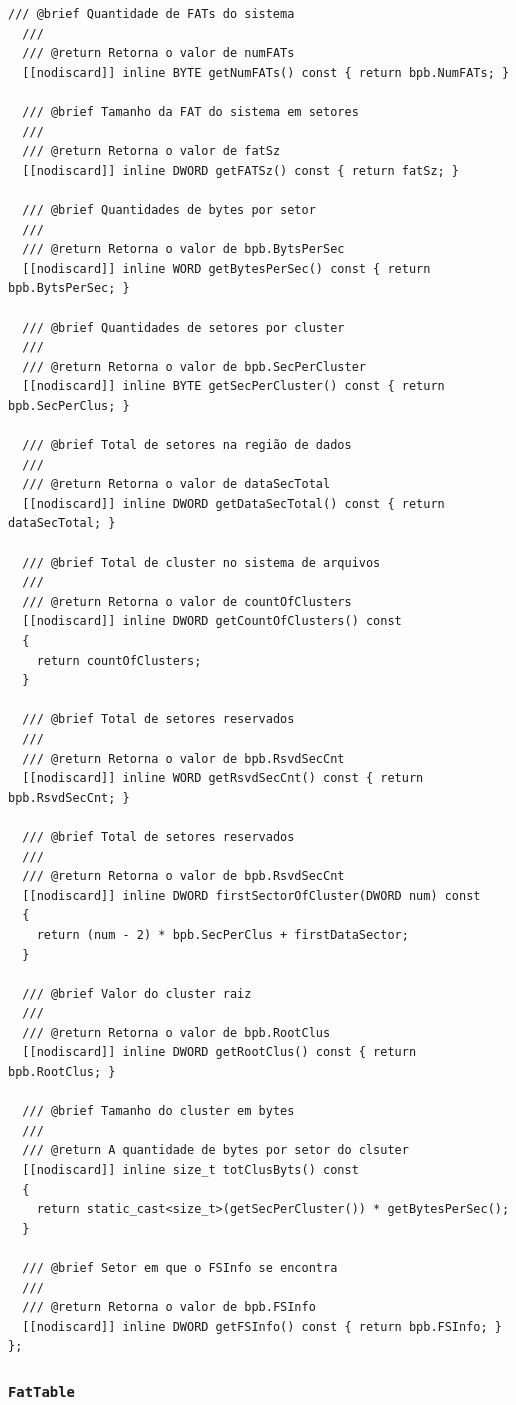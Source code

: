 \documentclass[
    12pt,				%
    oneside,   	        %
    a4paper,			%
    english,			%
    french,				%
    spanish,			%
    brazil,				%
    ]{pacotes/abntex2}
\begin{document}
\begin{lstlisting}[caption={Classe que abstrai a extração de informações da estrutura BPB}, label={lst:biosblock}]
  /// @brief Quantidade de FATs do sistema
  ///
  /// @return Retorna o valor de numFATs
  [[nodiscard]] inline BYTE getNumFATs() const { return bpb.NumFATs; }

  /// @brief Tamanho da FAT do sistema em setores
  ///
  /// @return Retorna o valor de fatSz
  [[nodiscard]] inline DWORD getFATSz() const { return fatSz; }

  /// @brief Quantidades de bytes por setor
  ///
  /// @return Retorna o valor de bpb.BytsPerSec
  [[nodiscard]] inline WORD getBytesPerSec() const { return bpb.BytsPerSec; }

  /// @brief Quantidades de setores por cluster
  ///
  /// @return Retorna o valor de bpb.SecPerCluster
  [[nodiscard]] inline BYTE getSecPerCluster() const { return bpb.SecPerClus; }

  /// @brief Total de setores na região de dados
  ///
  /// @return Retorna o valor de dataSecTotal
  [[nodiscard]] inline DWORD getDataSecTotal() const { return dataSecTotal; }

  /// @brief Total de cluster no sistema de arquivos
  ///
  /// @return Retorna o valor de countOfClusters
  [[nodiscard]] inline DWORD getCountOfClusters() const
  {
    return countOfClusters;
  }

  /// @brief Total de setores reservados
  ///
  /// @return Retorna o valor de bpb.RsvdSecCnt
  [[nodiscard]] inline WORD getRsvdSecCnt() const { return bpb.RsvdSecCnt; }

  /// @brief Total de setores reservados
  ///
  /// @return Retorna o valor de bpb.RsvdSecCnt
  [[nodiscard]] inline DWORD firstSectorOfCluster(DWORD num) const
  {
    return (num - 2) * bpb.SecPerClus + firstDataSector;
  }

  /// @brief Valor do cluster raiz
  ///
  /// @return Retorna o valor de bpb.RootClus
  [[nodiscard]] inline DWORD getRootClus() const { return bpb.RootClus; }

  /// @brief Tamanho do cluster em bytes
  ///
  /// @return A quantidade de bytes por setor do clsuter
  [[nodiscard]] inline size_t totClusByts() const
  {
    return static_cast<size_t>(getSecPerCluster()) * getBytesPerSec();
  }

  /// @brief Setor em que o FSInfo se encontra
  ///
  /// @return Retorna o valor de bpb.FSInfo
  [[nodiscard]] inline DWORD getFSInfo() const { return bpb.FSInfo; }
};
\end{lstlisting}

\subsubsection{\texttt{FatTable}}
\label{subsubsec:fat_table}
\end{document}
